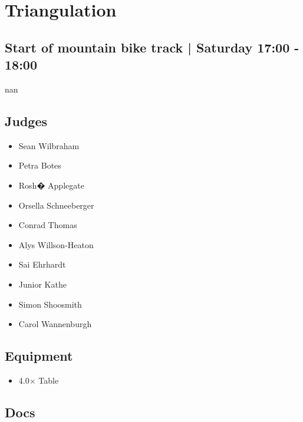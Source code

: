 \documentclass[10pt]{article}
\begin{document}
		\begin{minipage}{\linewidth}
		\setcounter{section}{18}
	\section{Triangulation }
	\subsection*{Start of mountain bike track | Saturday 17:00 - 18:00}

	nan

	\begin{multicols}{2}
	\subsection*{\faUsers \: Judges}
	\begin{itemize}
			\item Sean Wilbraham
			\item Petra Botes
			\item Rosh� Applegate
			\item Orsella Schneeberger
			\item Conrad Thomas
			\item Alys Willson-Heaton
			\item Sai Ehrhardt
			\item Junior Kathe
			\item Simon Shoosmith
			\item Carol Wannenburgh
		\end{itemize}
	\columnbreak
	\subsection*{\faWrench \: Equipment}
	
        \begin{itemize}
                    \item 4.0$\times$ \: Table
                \end{itemize}
                \vfill\null
        \subsection*{\faFile \: Docs}
     	\end{multicols}


	\vspace{1cm}
	\end{minipage}
\end{document}
